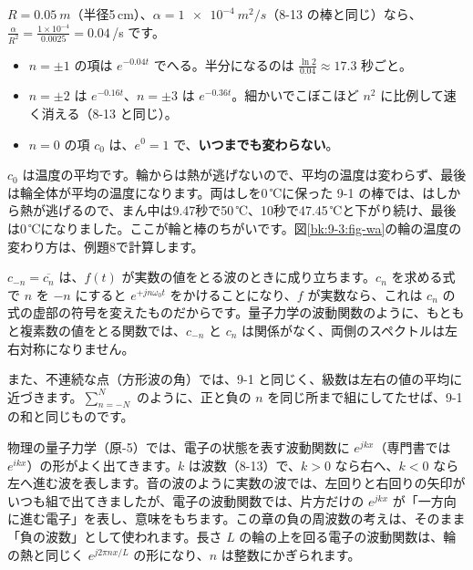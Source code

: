 $R=\qty{0.05}{m}$（半径5\,cm）、$\alpha=\qty{1e-4}{m^2/s}$（8-13 の棒と同じ）なら、$\tfrac{\alpha}{R^2}=\tfrac{1\times10^{-4}}{0.0025}=0.04$\,/s です。
\begin{itemize}[leftmargin=1.2\zw, itemsep=2pt, topsep=2pt, label={\color{\bkTT}●}]
\item $n=\pm1$ の項は $e^{-0.04t}$ でへる。半分になるのは $\tfrac{\ln2}{0.04}\approx17.3$ 秒ごと。
\item $n=\pm2$ は $e^{-0.16t}$、$n=\pm3$ は $e^{-0.36t}$。細かいでこぼこほど $n^2$ に比例して速く消える（8-13 と同じ）。
\item $n=0$ の項 $c_0$ は、$e^{0}=1$ で、\textbf{いつまでも変わらない}。
\end{itemize}
$c_0$ は温度の平均です。輪からは熱が逃げないので、平均の温度は変わらず、最後は輪全体が平均の温度になります。両はしを0\,℃に保った 9-1 の棒では、はしから熱が逃げるので、まん中は9.47秒で50\,℃、10秒で47.45\,℃と下がり続け、最後は0\,℃になりました。ここが輪と棒のちがいです。図\ref{bk:9-3:fig-wa}の輪の温度の変わり方は、例題8で計算します。

\begin{seikaku}
$c_{-n}=\overline{c_n}$ は、$f(t)$ が実数の値をとる波のときに成り立ちます。$c_n$ を求める式で $n$ を $-n$ にすると $e^{+jn\omega_0t}$ をかけることになり、$f$ が実数なら、これは $c_n$ の式の虚部の符号を変えたものだからです。量子力学の波動関数のように、もともと複素数の値をとる関数では、$c_{-n}$ と $c_n$ は関係がなく、両側のスペクトルは左右対称になりません。\par
また、不連続な点（方形波の角）では、9-1 と同じく、級数は左右の値の平均に近づきます。$\sum_{n=-N}^{N}$ のように、正と負の $n$ を同じ所まで組にしてたせば、9-1 の和と同じものです。
\end{seikaku}

\begin{motto}[5]
物理の量子力学（原-5）では、電子の状態を表す波動関数に $e^{jkx}$（専門書では $e^{ikx}$）の形がよく出てきます。$k$ は波数（8-13）で、$k>0$ なら右へ、$k<0$ なら左へ進む波を表します。音の波のように実数の波では、左回りと右回りの矢印がいつも組で出てきましたが、電子の波動関数では、片方だけの $e^{jkx}$ が「一方向に進む電子」を表し、意味をもちます。この章の負の周波数の考えは、そのまま「負の波数」として使われます。長さ $L$ の輪の上を回る電子の波動関数は、輪の熱と同じく $e^{j2\pi nx/L}$ の形になり、$n$ は整数にかぎられます。
\end{motto}

